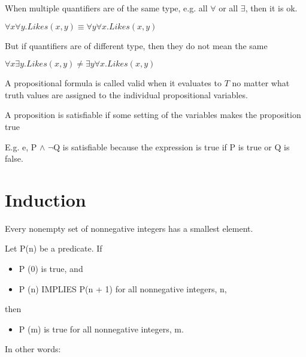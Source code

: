 \begin{lemma}
	When multiple quantifiers are of the same type, e.g. all $\forall$ or all $\exists$, then it is ok.
	\begin{center}
		$ \forall x \forall y . Likes(x,y) \equiv \forall y \forall x . Likes(x,y) $
	\end{center}
	
	
	But if quantifiers are of different type,
	then they do not mean the same
	\begin{center}
		$\forall x \exists y . Likes(x,y) \ne \exists y \forall x .Likes(x, y)$
	\end{center}

\end{lemma}

\begin{definition}[Validity]
	A propositional formula is called valid when it evaluates to $T$ no matter what truth
	values are assigned to the individual propositional variables.
\end{definition}

\begin{definition}[Satisfiability]
A proposition is satisfiable if some setting of the variables makes the proposition
true
\end{definition}


E.g.
e, P $\land$ $\neg$Q is satisfiable because the expression is true if P is true
or Q is false.

\section{Induction}

\begin{definition}
	Every nonempty set of nonnegative integers has a smallest element.	
\end{definition}


\begin{definition}[Induction]
	Let P(n) be a predicate. 
	If
	\begin{itemize}
		\item P (0) is true, and
		\item P (n) IMPLIES P(n + 1) for all nonnegative integers, n,  
	\end{itemize}
	then
	\begin{itemize}
		\item P (m) is true for all nonnegative integers, m.
	\end{itemize}

In other words:
	
\end{definition}

